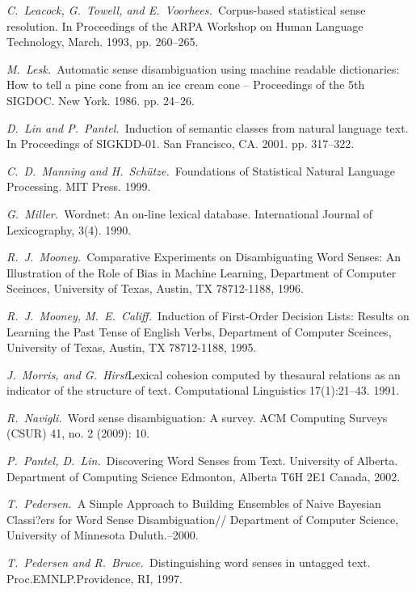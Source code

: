 \documentclass{article}
\begin{document}
\begin{articletext}
\begin{thebibliography}{9}
\textit{C.~Leacock, G.~Towell, and E.~Voorhees.~}Corpus-based statistical sense resolution. In Proceedings of the ARPA Workshop on Human Language Technology, March. 1993, pp. 260–265.  

\textit{M.~Lesk.~}Automatic sense disambiguation using machine readable dictionaries: How to tell a pine cone from an ice cream cone --  Proceedings  of  the 5th SIGDOC. New York. 1986. pp. 24–26. 

\textit{D.~Lin and P.~Pantel.~}Induction of semantic classes from natural language text. In Proceedings of SIGKDD-01. San Francisco, CA. 2001. pp. 317–322.   

\textit{C.~D.~Manning and H.~Sch\"utze.~}Foundations of Statistical Natural Language Processing. MIT Press. 1999.

\textit{G.~Miller.~}Wordnet: An on-line lexical database. International Journal of Lexicography, 3(4). 1990.

\textit{R.~J.~Mooney.~}Comparative Experiments on Disambiguating Word Senses:
An Illustration of the Role of Bias in Machine Learning, Department of Computer Sceinces, University of Texas, Austin, TX 78712-1188, 1996.

\textit{R.~J.~Mooney, M.~E.~Califf.~}Induction of First-Order Decision Lists: Results on Learning the Past Tense of English Verbs, Department of Computer Sceinces, University of Texas, Austin, TX 78712-1188, 1995.

\textit{J.~Morris, and G.~Hirst}Lexical cohesion computed by thesaural relations as an indicator of the structure of text. Computational Linguistics 17(1):21–43. 1991. 

\textit{R.~Navigli.~}Word sense disambiguation: A survey. ACM Computing Surveys (CSUR) 41, no. 2 (2009): 10.

\textit{P.~Pantel, D.~Lin.~}Discovering Word Senses from Text. University of Alberta. Department of Computing Science Edmonton, Alberta T6H 2E1 Canada, 2002.

\textit{T.~Pedersen.~}A Simple Approach to Building Ensembles of Naive Bayesian Classi?ers for Word Sense Disambiguation// Department of Computer Science, University of Minnesota Duluth.–2000.

\textit{T.~Pedersen and R.~Bruce.~}Distinguishing word senses in untagged text. Proc.EMNLP.Providence, RI, 1997.


\end{thebibliography}
\end{articletext}
\end{document}
